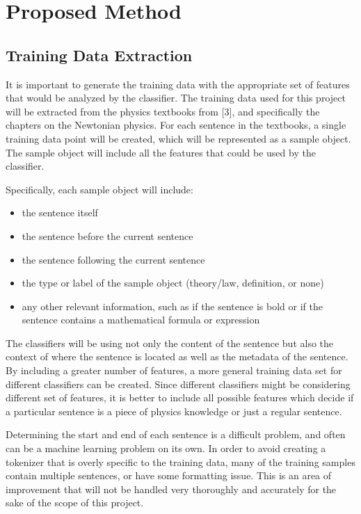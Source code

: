 \documentclass{article} %
\begin{document}
\section{Proposed Method}

\subsection{Training Data Extraction}

It is important to generate the training data with the appropriate set of features that would be analyzed by the classifier. The training data used for this project will be extracted from the physics textbooks from [3], and specifically the chapters on the Newtonian physics. For each sentence in the textbooks, a single training data point will be created, which will be represented as a sample object. The sample object will include all the features that could be used by the classifier.

Specifically, each sample object will include:
\begin{itemize}
	\item the sentence itself
	\item the sentence before the current sentence
	\item the sentence following the current sentence
	\item the type or label of the sample object (theory/law, definition, or none)
	\item any other relevant information, such as if the sentence is bold or if the sentence contains a mathematical formula or expression
\end{itemize}

The classifiers will be using not only the content of the sentence but also the context of where the sentence is located as well as the metadata of the sentence. By including a greater number of features, a more general training data set for different classifiers can be created. Since different classifiers might be considering different set of features, it is better to include all possible features which decide if a particular sentence is a piece of physics knowledge or just a regular sentence.

Determining the start and end of each sentence is a difficult problem, and often can be a machine learning problem on its own. In order to avoid creating a tokenizer that is overly specific to the training data, many of the training samples contain multiple sentences, or have some formatting issue. This is an area of improvement that will not be handled very thoroughly and accurately for the sake of the scope of this project.
\end{document}

